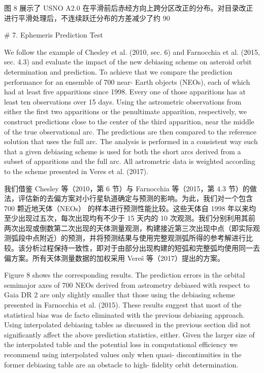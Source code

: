 图 8 展示了 USNO A2.0 在平滑前后赤经方向上跨分区改正的分布。对目录改正进行平滑处理后，不连续跃迁分布的方差减少了约 90%

# 7. Ephemeris Prediction Test

We follow the example of Chesley et al. (2010, sec. 6) and Farnocchia et al. (2015, sec. 4.3) and evaluate the impact of the new debiasing scheme on asteroid orbit determination and prediction. To achieve that we compare the prediction performance for an ensemble of 700 near- Earth objects (NEOs), each of which had at least five apparitions since 1998. Every one of those apparitions has at least ten observations over 15 days. Using the astrometric observations from either the first two apparitions or the penultimate apparition, respectively, we construct predictions close to the center of the third apparition, near the middle of the true observational arc. The predictions are then compared to the reference solution that uses the full arc. The analysis is performed in a consistent way such that a given debiasing scheme is used for both the short arcs derived from a subset of apparitions and the full arc. All astrometric data is weighted according to the scheme presented in Veres et al. (2017).

我们借鉴 Chesley 等（2010，第 6 节）与 Farnocchia 等（2015，第 4.3 节）的做法，评估新的去偏方案对小行星轨道确定与预测的影响。为此，我们对一个包含 700 颗近地天体（NEOs） 的样本进行预测性能比较。这些天体自 1998 年以来均至少出现过五次，每次出现均有不少于 15 天内的 10 次观测。我们分别利用其前两次出现或倒数第二次出现的天体测量观测，构建接近第三次出现中点（即实际观测弧段中点附近）的预测，并将预测结果与使用完整观测弧所得的参考解进行比较。该分析过程保持一致性，即对于由部分出现构建的短弧和完整弧均使用同一去偏方案。所有天体测量数据的加权采用 Vereš 等（2017）提出的方案。

Figure 8 shows the corresponding results. The prediction errors in the orbital semimajor axes of 700 NEOs derived from astrometry debiased with respect to Gaia DR 2 are only slightly smaller that those using the debiasing scheme presented in Farnocchia et al. (2015). These results suggest that most of the statistical bias was de facto eliminated with the previous debiasing approach. Using interpolated debiasing tables as discussed in the previous section did not significantly affect the above prediction statistics, either. Given the larger size of the interpolated table and the potential loss in computational efficiency we recommend using interpolated values only when quasi- discontinuities in the former debiasing table are an obstacle to high- fidelity orbit determination.

